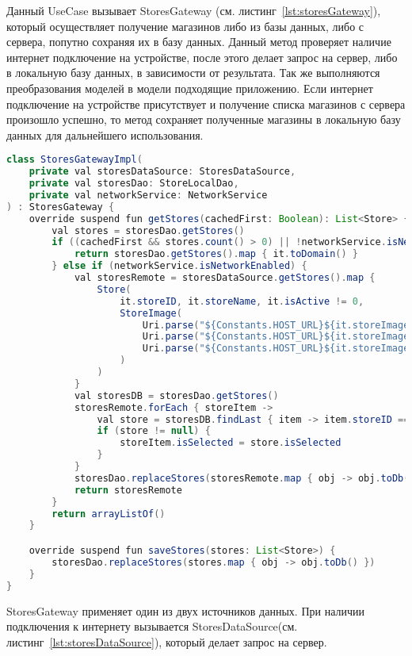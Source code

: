 Данный UseCase вызывает StoresGateway (см. листинг~\ref{lst:storesGateway}), который осуществляет получение магазинов либо из базы данных, либо с сервера, попутно сохраняя их в базу данных. Данный метод проверяет наличие интернет подключение на устройстве, после этого делает запрос на сервер, либо в локальную базу данных, в зависимости от результата. Так же выполняются преобразования моделей в модели подходящие приложению. Если интернет подключение на устройстве присутствует и получение списка магазинов с сервера произошло успешно, то метод сохраняет полученные магазины в локальную базу данных для дальнейшего использования.
\begin{lstlisting}[language=Java,label={lst:storesGateway},caption={StoresGateway}]
class StoresGatewayImpl(
    private val storesDataSource: StoresDataSource,
    private val storesDao: StoreLocalDao,
    private val networkService: NetworkService
) : StoresGateway {
    override suspend fun getStores(cachedFirst: Boolean): List<Store> {
        val stores = storesDao.getStores()
        if ((cachedFirst && stores.count() > 0) || !networkService.isNetworkEnabled) {
            return storesDao.getStores().map { it.toDomain() }
        } else if (networkService.isNetworkEnabled) {
            val storesRemote = storesDataSource.getStores().map {
                Store(
                    it.storeID, it.storeName, it.isActive != 0,
                    StoreImage(
                        Uri.parse("${Constants.HOST_URL}${it.storeImage.bannerPath}"),
                        Uri.parse("${Constants.HOST_URL}${it.storeImage.logoPath}"),
                        Uri.parse("${Constants.HOST_URL}${it.storeImage.iconPath}")
                    )
                )
            }
            val storesDB = storesDao.getStores()
            storesRemote.forEach { storeItem ->
                val store = storesDB.findLast { item -> item.storeID == storeItem.id }
                if (store != null) {
                    storeItem.isSelected = store.isSelected
                }
            }
            storesDao.replaceStores(storesRemote.map { obj -> obj.toDb() })
            return storesRemote
        }
        return arrayListOf()
    }

    override suspend fun saveStores(stores: List<Store>) {
        storesDao.replaceStores(stores.map { obj -> obj.toDb() })
    }
}

\end{lstlisting}


StoresGateway применяет один из двух источников данных. При наличии подключения к интернету вызывается StoresDataSource(см. листинг~\ref{lst:storesDataSource}), который делает запрос на сервер.

